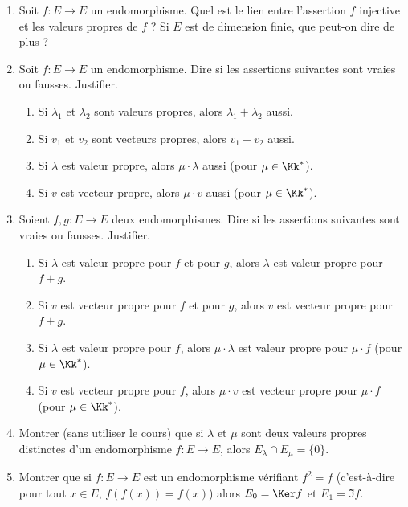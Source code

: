 \documentclass[12pt, class=report,crop=false]{standalone}
\begin{document}
 
\begin{miniexercices}
\sauteligne
\begin{enumerate}
  \item Soit $f : E \to E$ un endomorphisme. Quel est le lien entre l'assertion \og{}$f$ injective\fg{} et les valeurs propres de $f$ ? Si $E$ est de dimension finie, que peut-on dire de plus ?
  
  \item Soit $f : E \to E$ un endomorphisme. Dire si les assertions suivantes sont vraies ou fausses. Justifier.
  \begin{enumerate}
    \item Si $\lambda_1$ et $\lambda_2$ sont valeurs propres, alors $\lambda_1+\lambda_2$ aussi.
    \item Si $v_1$ et $v_2$ sont vecteurs propres, alors $v_1+v_2$ aussi.
    \item Si $\lambda$ est valeur propre, alors $\mu\cdot\lambda$ aussi (pour $\mu\in \Kk^*$).
    \item Si $v$ est vecteur propre, alors $\mu \cdot v$ aussi (pour $\mu\in \Kk^*$).    
  \end{enumerate}

  \item Soient $f,g : E \to E$ deux endomorphismes. Dire si les assertions suivantes sont vraies ou fausses. Justifier.
  \begin{enumerate}
    \item Si $\lambda$ est valeur propre pour $f$ et pour $g$, alors $\lambda$ est valeur propre 
    pour $f+g$.
    \item Si $v$ est vecteur propre pour $f$ et pour $g$, alors $v$ est vecteur propre 
    pour $f+g$.
    \item Si $\lambda$ est valeur propre pour $f$, alors $\mu \cdot\lambda$ est valeur propre 
    pour $\mu \cdot f$ (pour $\mu\in \Kk^*$).
    \item Si $v$ est vecteur propre pour $f$, alors $\mu \cdot v$ est vecteur propre 
    pour $\mu \cdot f$ (pour $\mu\in \Kk^*$).
  \end{enumerate}
  
  \item Montrer (sans utiliser le cours) que si $\lambda$ et $\mu$ sont deux valeurs propres distinctes d'un endomorphisme $f : E \to E$, alors $E_\lambda \cap E_\mu = \{ 0 \}$.
  
  \item Montrer que si $f : E \to E$ est un endomorphisme vérifiant $f^2 = f$ (c'est-à-dire
  pour tout $x\in E$, $f(f(x))=f(x)$) alors $E_0 = \Ker f$ et $E_1 = \Im f$.  
  
  
\end{enumerate}
\end{miniexercices}
\end{document}
